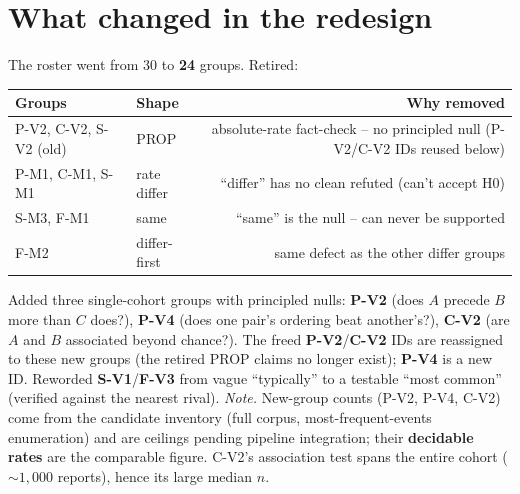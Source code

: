 \documentclass[11pt]{article}
\begin{document}
\section*{What changed in the redesign}
The roster went from 30 to \textbf{24} groups. Retired:
\noindent\begin{tabularx}{\linewidth}{llR}
\toprule
\textbf{Groups} & \textbf{Shape} & \textbf{Why removed} \\ \midrule
P-V2, C-V2, S-V2 (old) & PROP & absolute-rate fact-check -- no principled null (P-V2/C-V2 IDs reused below) \\
P-M1, C-M1, S-M1 & rate differ & ``differ'' has no clean refuted (can't accept H0) \\
S-M3, F-M1 & same & ``same'' is the null -- can never be supported \\
F-M2 & differ-first & same defect as the other differ groups \\
\bottomrule\end{tabularx}
\medskip\noindent Added three single-cohort groups with principled nulls: \textbf{P-V2} (does $A$ precede $B$ more than $C$ does?), \textbf{P-V4} (does one pair's ordering beat another's?), \textbf{C-V2} (are $A$ and $B$ associated beyond chance?). The freed \textbf{P-V2}/\textbf{C-V2} IDs are reassigned to these new groups (the retired PROP claims no longer exist); \textbf{P-V4} is a new ID. Reworded \textbf{S-V1}/\textbf{F-V3} from vague ``typically'' to a testable ``most common'' (verified against the nearest rival).
\medskip\noindent\emph{Note.} New-group counts (P-V2, P-V4, C-V2) come from the candidate inventory (full corpus, most-frequent-events enumeration) and are ceilings pending pipeline integration; their \textbf{decidable rates} are the comparable figure. C-V2's association test spans the entire cohort (${\sim}1{,}000$ reports), hence its large median $n$.
\end{document}
